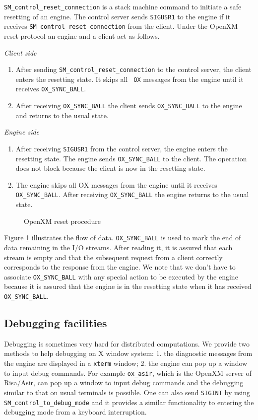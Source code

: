 {\tt SM\_control\_reset\_connection} is a stack machine command to
initiate a safe resetting of an engine.
The control server sends {\tt SIGUSR1} to the engine if it receives
{\tt SM\_control\_reset\_connection} from the client.
Under the OpenXM reset protocol an engine and a client act as follows.

\vskip 2mm
\noindent
{\it Client side} 
\begin{enumerate}
\item After sending {\tt SM\_control\_reset\_connection} to the
control server, the client enters the resetting state. It skips all {\tt
OX} messages from the engine until it receives {\tt OX\_SYNC\_BALL}.
\item After receiving {\tt OX\_SYNC\_BALL} the client sends 
{\tt OX\_SYNC\_BALL} to the engine and returns to the usual state.
\end{enumerate}

\noindent
{\it Engine side}
\begin{enumerate}
\item 
After receiving {\tt SIGUSR1} from the control server,
the engine enters the resetting state.
The engine sends {\tt OX\_SYNC\_BALL} to the client.
The operation does not block because
the client is now in the resetting state.
\item The engine skips all OX messages from the engine until it
receives {\tt OX\_SYNC\_BALL}. After receiving {\tt OX\_SYNC\_BALL} 
the engine returns to the usual state.
\end{enumerate}

\begin{figure}[htbp]
\epsfxsize=8.5cm
\caption{OpenXM reset procedure}
\label{reset}
\end{figure}

Figure \ref{reset} illustrates the flow of data.
{\tt OX\_SYNC\_BALL} is used to mark the end of data remaining in the
I/O streams. After reading it, it is assured that each stream is empty
and that the subsequent request from a client correctly 
corresponds to the response from the engine.
We note that we don't have to associate {\tt OX\_SYNC\_BALL} with
any special action to be executed by the engine because it is
assured that the engine is in the resetting state when it has received
{\tt OX\_SYNC\_BALL}.

\subsection{Debugging facilities}
Debugging is sometimes very hard for distributed computations.
We provide two methods to help debugging on X window system:
1. the diagnostic messages from the engine are displayed in a {\tt xterm}
window;
2. the engine can pop up a window to input debug commands.
For example {\tt ox\_asir}, which is
the OpenXM server of Risa/Asir, can pop up a window to input
debug commands and the debugging similar to that on usual terminals is possible.
One can also send {\tt SIGINT} by using {\tt SM\_control\_to\_debug\_mode}
and it provides a similar functionality to entering the debugging
mode from a keyboard interruption.
